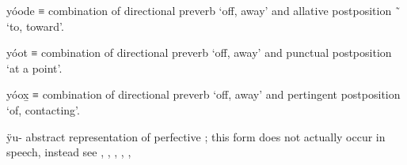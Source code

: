 \begin{morphdesc}[resume*=alphalist]
\item[yóode]\label{m:yóode}
	≡  combination of directional preverb  ‘off, away’
		and allative postposition  \~\  ‘to, toward’.

\item[yóot]\label{m:yóot}
	≡  combination of directional preverb  ‘off, away’
		and punctual postposition  ‘at a point’.

\item[yóox̱]\label{m:yóox̱}
	≡  combination of directional preverb  ‘off, away’
		and pertingent postposition  ‘of, contacting’.

\item[ÿu-]\label{m:ÿu-} 
	abstract representation of perfective ;
	this form does not actually occur in speech, instead see
		, , ,  , , 


\end{morphdesc}
